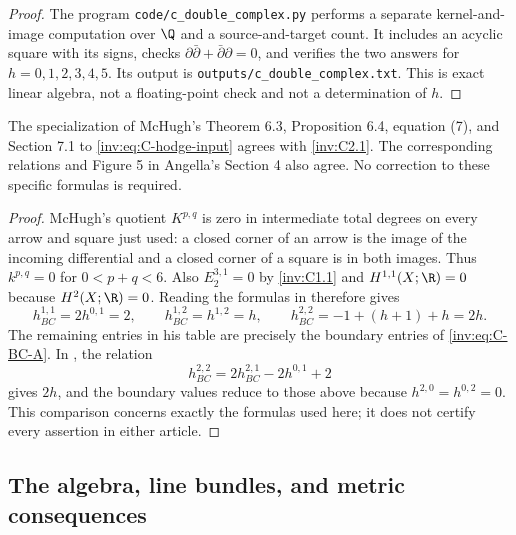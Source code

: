 \begin{proof}
The program \texttt{code/c\_double\_complex.py} performs a separate
kernel-and-image computation over $\Q$ and a source-and-target
count.  It includes an acyclic square with its signs, checks
$\partial\bar\partial+\bar\partial\partial=0$, and verifies the
two answers for $h=0,1,2,3,4,5$.  Its output is
\texttt{outputs/c\_double\_complex.txt}.  This is exact linear
algebra, not a floating-point check and not a determination of $h$.
\end{proof}

\begin{proposition}\label{inv:C2.2}
The specialization of McHugh's Theorem 6.3, Proposition 6.4, equation
(7), and Section 7.1 to \eqref{inv:eq:C-hodge-input} agrees with \ref{inv:C2.1}.
The corresponding relations and Figure 5 in Angella's Section 4 also
agree.  No correction to these specific formulas is required.
\end{proposition}

\begin{proof}
McHugh's quotient $K^{p,q}$ is zero in intermediate total degrees
on every arrow and square just used: a closed corner of an arrow is
the image of the incoming differential and a closed corner of a square
is in both images.  Thus $k^{p,q}=0$ for $0<p+q<6$.
Also $E_2^{3,1}=0$ by \ref{inv:C1.1} and $H^{1,1}(X;\R)=0$ because
$H^2(X;\R)=0$.  Reading the formulas in
\citet[Theorem 6.3, Proposition 6.4, (7), pp. 20--25]{McHugh2018}
therefore gives
\[
h_{BC}^{1,1}=2h^{0,1}=2,\qquad
h_{BC}^{1,2}=h^{1,2}=h,\qquad
h_{BC}^{2,2}=-1+(h+1)+h=2h.
\]
The remaining entries in his table are precisely the boundary entries
of \eqref{inv:eq:C-BC-A}.  In
\citet[Section 4, pp. 13--16]{Angella2018}, the relation
\[
h_{BC}^{2,2}=2h_{BC}^{2,1}-2h^{0,1}+2
\]
gives $2h$, and the boundary values reduce to those above because
$h^{2,0}=h^{0,2}=0$.  This comparison concerns exactly the formulas
used here; it does not certify every assertion in either article.
\end{proof}

\subsection{The algebra, line bundles, and metric consequences}


